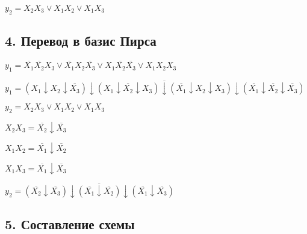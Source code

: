$y_2 = X_2 X_3 \lor X_1 X_2 \lor X_1 X_3$

\clearpage
\subsection*{4. Перевод в базис Пирса}

$y_1 = \overline{X_1} \overline{X_2} X_3 \lor \overline{X_1} X_2 \overline{X_3} \lor X_1 \overline{X_2} \overline{X_3} \lor X_1 X_2 X_3$

$y_1 = \overline{(X_1 \downarrow X_2 \downarrow \overline{X_3}) \downarrow (X_1 \downarrow \overline{X_2} \downarrow X_3) \downarrow (\overline{X_1} \downarrow X_2 \downarrow X_3) \downarrow (\overline{X_1} \downarrow \overline{X_2} \downarrow \overline{X_3})}$

$y_2 = X_2 X_3 \lor X_1 X_2 \lor X_1 X_3$

$X_2 X_3 = \overline{X_2} \downarrow \overline{X_3}$

$X_1 X_2 = \overline{X_1} \downarrow \overline{X_2}$

$X_1 X_3 = \overline{X_1} \downarrow \overline{X_3}$

$y_2 = \overline{ (\overline{X_2} \downarrow \overline{X_3}) \downarrow (\overline{X_1} \downarrow \overline{X_2}) \downarrow (\overline{X_1} \downarrow \overline{X_3}) }$

\subsection*{5. Составление схемы}

